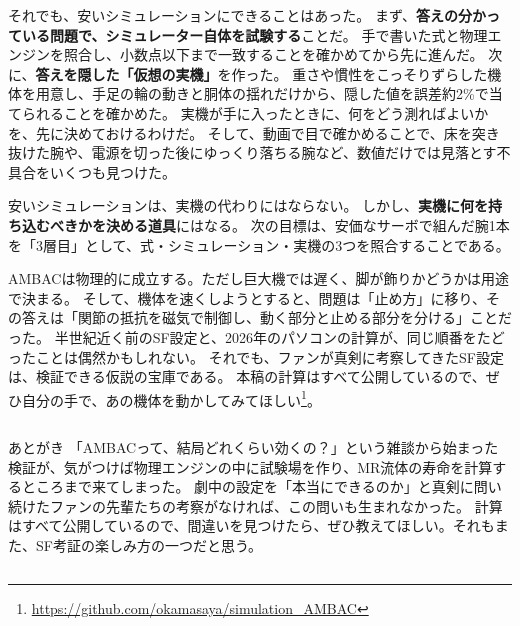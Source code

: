 \documentclass[paper=a4paper,fontsize=10pt,twocolumn,column_gap=2zw,line_length=24zw,number_of_lines=46,head_space=18mm]{jlreq}
\makeatletter
\newcommand{\repo}{https://github.com/okamasaya/simulation_AMBAC}
\newcounter{msec}
\renewcommand{\section}{\@ifstar{\msecstar}{\msecbox}}
\newcommand{\msecstar}[1]{\par\addvspace{0.6\baselineskip}\noindent{\bfseries\color{accent2}#1}\par\nopagebreak\vspace{0.2\baselineskip}}
\newcommand{\msecbox}[1]{\par\addvspace{0.8\baselineskip}\refstepcounter{msec}%
  \noindent\colorbox{accent2}{\parbox{\dimexpr\linewidth-2\fboxsep}{\color{white}\bfseries\large\strut\themsec\quad #1}}%
  \par\nopagebreak\vspace{0.4\baselineskip}\nopagebreak}
\makeatother
\begin{document}
それでも、安いシミュレーションにできることはあった。
まず、\textbf{答えの分かっている問題で、シミュレーター自体を試験する}ことだ。
手で書いた式と物理エンジンを照合し、小数点以下まで一致することを確かめてから先に進んだ。
次に、\textbf{答えを隠した「仮想の実機」}を作った。
重さや慣性をこっそりずらした機体を用意し、手足の輪の動きと胴体の揺れだけから、隠した値を誤差約2\%で当てられることを確かめた。
実機が手に入ったときに、何をどう測ればよいかを、先に決めておけるわけだ。
そして、動画で目で確かめることで、床を突き抜けた腕や、電源を切った後にゆっくり落ちる腕など、数値だけでは見落とす不具合をいくつも見つけた。

安いシミュレーションは、実機の代わりにはならない。
しかし、\textbf{実機に何を持ち込むべきかを決める道具}にはなる。
次の目標は、安価なサーボで組んだ腕1本を「3層目」として、式・シミュレーション・実機の3つを照合することである。

\section{おわりに}

AMBACは物理的に成立する。ただし巨大機では遅く、脚が飾りかどうかは用途で決まる。
そして、機体を速くしようとすると、問題は「止め方」に移り、その答えは「関節の抵抗を磁気で制御し、動く部分と止める部分を分ける」ことだった。
半世紀近く前のSF設定と、2026年のパソコンの計算が、同じ順番をたどったことは偶然かもしれない。
それでも、ファンが真剣に考察してきたSF設定は、検証できる仮説の宝庫である。
本稿の計算はすべて公開しているので、ぜひ自分の手で、あの機体を動かしてみてほしい\footnote{\url{\repo}}。

\begin{column}{あとがき}
「AMBACって、結局どれくらい効くの？」という雑談から始まった検証が、気がつけば物理エンジンの中に試験場を作り、MR流体の寿命を計算するところまで来てしまった。
劇中の設定を「本当にできるのか」と真剣に問い続けたファンの先輩たちの考察がなければ、この問いも生まれなかった。
計算はすべて公開しているので、間違いを見つけたら、ぜひ教えてほしい。それもまた、SF考証の楽しみ方の一つだと思う。
\end{column}
\end{document}

